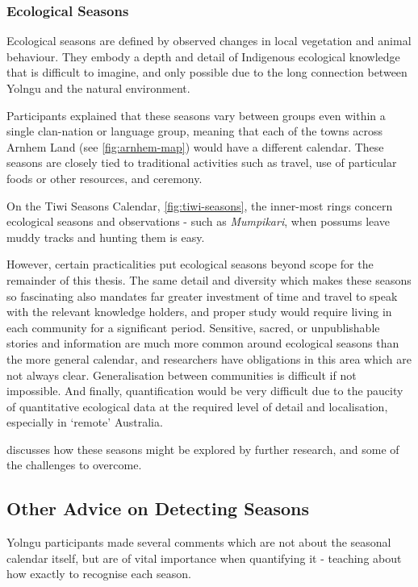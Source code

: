 





\subsubsection{Ecological Seasons}
Ecological seasons are defined by observed changes in local vegetation
and animal behaviour.  They embody a depth and detail of Indigenous
ecological knowledge that is difficult to imagine, and only possible
due to the long connection between Yolngu and the natural environment.

Participants explained that these seasons vary between groups even within
a single clan-nation or language group, meaning that each of the towns
across Arnhem Land (see \cref{fig:arnhem-map}) would have a different
calendar. These seasons are closely tied to traditional activities such as
travel, use of particular foods or other resources, and ceremony.

On the Tiwi Seasons Calendar, \cref{fig:tiwi-seasons}, the inner-most
rings concern ecological seasons and observations - such as
\textit{Mumpikari}, when possums leave muddy tracks and hunting them is easy.

However, certain practicalities put ecological seasons beyond scope
for the remainder of this thesis.
The same detail and diversity which makes these seasons so fascinating
also mandates far greater investment of time and travel to speak
with the relevant knowledge holders, and proper study would require
living in each community for a significant period.
Sensitive, sacred, or unpublishable stories and information are much more
common around ecological seasons than the more general calendar,
and researchers have obligations in this area which are not always clear.
Generalisation between communities is difficult if not impossible.
And finally, quantification would be very difficult due to the paucity
of quantitative ecological data at the required level of detail
and localisation, especially in `remote' Australia.

 discusses how these seasons might be explored
by further research, and some of the challenges to overcome.



\subsection{Other Advice on Detecting Seasons}
\label{subsec:detection-advice}
Yolngu participants made several comments which are not about
the seasonal calendar itself, but are of vital importance when quantifying
it - teaching about how exactly to recognise each season.

